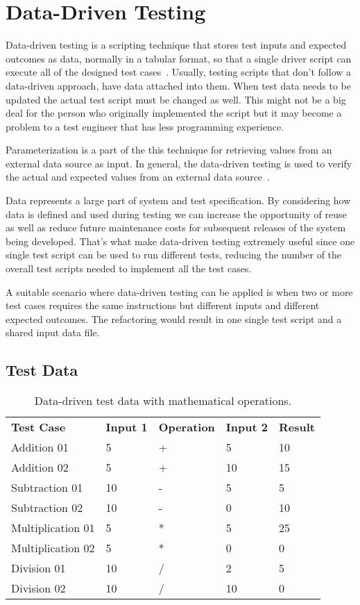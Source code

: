 \section{Data-Driven Testing}

Data-driven testing is a scripting technique that stores test inputs and
expected outcomes as data, normally in a tabular format, so that a single
driver script can execute all of the designed test cases~\cite{Fewster99}.
Usually, testing scripts that don't follow a data-driven approach, have data
attached into them. When test data needs to be updated the actual test script
must be changed as well. This might not be a big deal for the person who
originally implemented the script but it may become a problem to a test engineer
that has less programming experience.

Parameterization is a part of the this technique for retrieving values from
an external data source as input. In general, the data-driven testing is used to
verify the actual and expected values from an external data source~\cite{Sams:2015}.

Data represents a large part of system and test specification. By considering
how data is defined and used during testing we can increase the opportunity
of reuse as well as reduce future maintenance costs for subsequent releases of
the system being developed. That's what make data-driven testing extremely
useful since one single test script can be used to run different tests, reducing
the number of the overall test scripts needed to implement all the test cases.

A suitable scenario where data-driven testing can be applied is when two or more
test cases requires the same instructions but different inputs and different
expected outcomes. The refactoring would result in one single test script and a
shared input data file.

\subsection{Test Data}

\begin{table}[!ht]
\centering
\begin{tabular}{lllll}
\textbf{Test Case} & \textbf{Input 1} & \textbf{Operation} & \textbf{Input 2} & \textbf{Result} \\
Addition 01 & 5 & + & 5 & 10 \\
Addition 02 & 5 & + & 10 & 15 \\
Subtraction 01 & 10 & - & 5 & 5 \\
Subtraction 02 & 10 & - & 0 & 10 \\
Multiplication 01 & 5 & * & 5 & 25 \\
Multiplication 02 & 5 & * & 0 & 0 \\
Division 01 & 10 & / & 2 & 5 \\
Division 02 & 10 & / & 10 & 0 \\
\end{tabular}
\caption{Data-driven test data with mathematical operations.}
\label{table:tab1}
\end{table}

